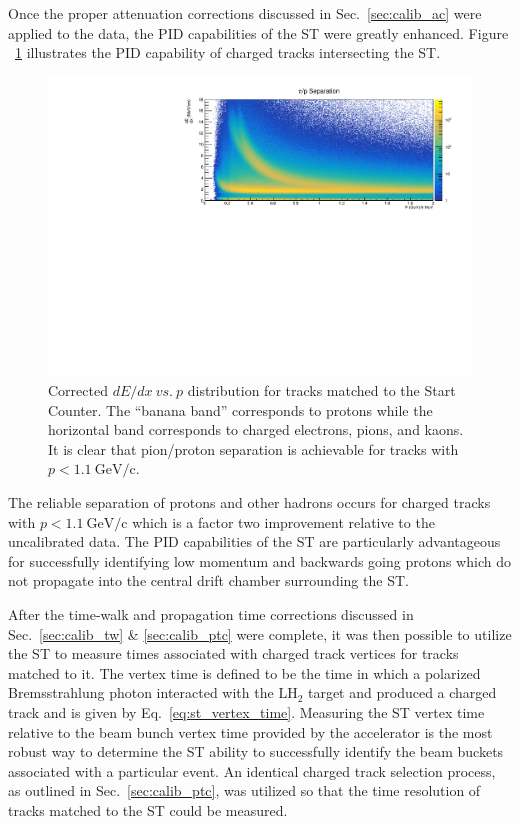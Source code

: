 Once the proper attenuation corrections discussed in Sec.~\ref{sec:calib_ac} were applied to the data, the PID capabilities of the ST were greatly enhanced.  Figure ~\ref{fig:dEdx_vs_p_corr} illustrates the PID capability of charged tracks intersecting the ST.  
	\begin{figure}[!htb]
		\centering
		\includegraphics[width=1.0\columnwidth]{performance/figs/Att_corr}
		\caption{Corrected $dE/dx\ vs.\ p$ distribution for tracks matched to the Start Counter.  The ``banana band'' corresponds to protons while the horizontal band corresponds to charged electrons, pions, and kaons.  It is clear that pion/proton separation is achievable for tracks with $p < 1.1\ \mathrm{GeV/c}$.}
		\label{fig:dEdx_vs_p_corr}
	\end{figure}  
The reliable separation of protons and other hadrons occurs for charged tracks with $p < 1.1\ \mathrm{GeV/c}$ which is a factor two improvement relative to the uncalibrated data.  The PID capabilities of the ST are particularly advantageous for successfully identifying low momentum and backwards going protons which do not propagate into the central drift chamber surrounding the ST.

After the time-walk and propagation time corrections discussed in Sec.~\ref{sec:calib_tw} \& \ref{sec:calib_ptc} were complete, it was then possible to utilize the ST to measure times associated with charged track vertices for tracks matched to it.  The vertex time is defined to be the time in which a polarized Bremsstrahlung photon interacted with the $\mathrm{LH_{2}}$ target and produced a charged track and is given by Eq.~\ref{eq:st_vertex_time}.  Measuring the ST vertex time relative to the beam bunch vertex time provided by the accelerator is the most robust way to determine the ST ability to successfully identify the beam buckets associated with a particular event.  An identical charged track selection process, as outlined in Sec.~\ref{sec:calib_ptc}, was utilized so that the time resolution of tracks matched to the ST could be measured.  

